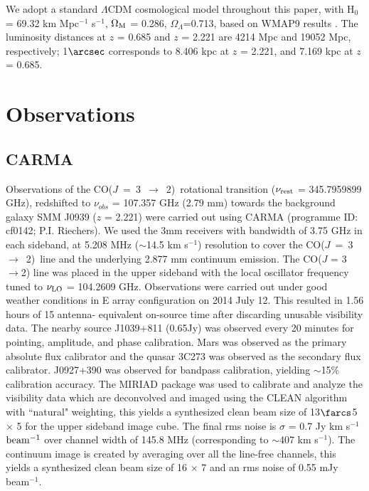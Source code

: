 \documentclass[twocolumn,apj,numberedappendix]{emulateapj}
\newcommand{\rarr}{$\rightarrow$}
\newcommand{\CO}{\mbox{CO($J$ = 3 $\rightarrow$ 2) }}
\newcommand{\pmOne}{$^{-1}$}
\begin{document}
We adopt a standard $\Lambda$CDM cosmological model throughout this paper, with H$_0$= 69.32 km Mpc\pmOne
s\pmOne, $\Omega_{\rm M}$ = 0.286, $\Omega_\Lambda$=0.713, based on WMAP9 results \citep{Hinshaw13a}.
The luminosity distances at $z$ = 0.685 and $z$ = 2.221 are 4214 Mpc and 19052 Mpc, respectively; 1$\arcsec$
corresponds to 8.406 kpc at $z$ = 2.221, and 7.169 kpc at $z$ = 0.685.

\section{Observations}\label{sec:obs}
\subsection{CARMA} \label{sec:carmadata}
Observations of the \CO rotational transition ($\nu_{\rm rest}$ = 345.7959899 GHz),
redshifted to $\nu_{obs}$ = 107.357 GHz (2.79 mm) towards the background galaxy SMM
J0939 ($z$ = 2.221) were carried out using CARMA (programme ID: cf0142; P.I. Riechers).
We used the 3mm receivers with bandwidth of 3.75 GHz in each sideband, at 5.208 MHz ($\sim$14.5 km s\pmOne)
resolution to cover the \CO line and the underlying 2.877 mm continuum emission. The CO($J$ = 3 
\rarr 2) line was placed in the
upper sideband with the local oscillator frequency tuned to $\nu_{\rm LO}$ = 104.2609 GHz.
Observations were carried out under good
weather conditions in E array configuration on 2014 July 12. This resulted in 1.56 hours of 15 antenna-
equivalent on-source time after discarding unusable visibility data.
The nearby source J1039+811 (0.65Jy) was observed every 20 minutes for
pointing, amplitude, and phase calibration. Mars was observed as the primary
absolute flux calibrator and the quasar 3C273 was observed as the secondary
flux calibrator. J0927+390 was observed for bandpass calibration, yielding $\sim
$15\% calibration accuracy.
The {\sc MIRIAD} package was used to calibrate and analyze the visibility data which are deconvolved and imaged using
the CLEAN algorithm with ``natural" weighting, this yields a synthesized clean beam size of 13$\farcs$5 $\times$ 
5 for the upper sideband image cube. The final rms noise is $\sigma$ = 0.7 Jy km s\pmOne $\rm beam^{-1}$ over channel width of 145.8 MHz (corresponding to $\sim$407 km s\pmOne). The continuum image is created by
averaging over all the line-free channels, this yields a synthesized clean beam size of 16 $\times$ 7 and an 
rms noise of 0.55 mJy beam\pmOne.
\end{document}
